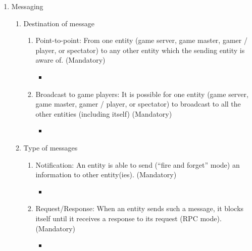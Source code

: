\begin{enumerate}
\item Messaging
\label{R_1}
\begin{enumerate}
\item Destination of message
\label{R_1_a}
\begin{enumerate}
\item Point-to-point: From one entity (game server, game master, gamer
  / player, or spectator) to any other entity which the sending entity
  is aware of. (Mandatory)
\label{R_1_a_i}
\begin{itemize}
\item {}
\end{itemize}
\item Broadcast to game players: It is possible for one entity (game
  server, game master, gamer / player, or spectator) to broadcast to
  all the other entities (including itself) (Mandatory)
\label{R_1_a_ii}
\begin{itemize}
\item {}
\end{itemize}
\end{enumerate}
\item Type of messages
\label{R_1_b}
\begin{enumerate}
\item Notification: An entity is able to send (``fire and forget''
  mode) an information to other entity(ies). (Mandatory)
\label{R_1_b_i}
\begin{itemize}
\item {}
\end{itemize}
\item Request/Response: When an entity sends such a message, it blocks
  itself until it receives a response to its request (RPC
  mode). (Mandatory)
\begin{itemize}
\item {}
\end{itemize}
\end{enumerate}
\end{enumerate}
\end{enumerate}
